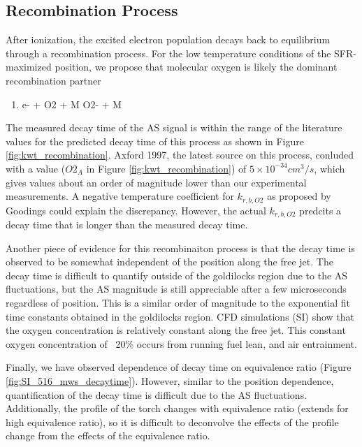 \subsection{Recombination Process}

After ionization, the excited electron population decays back to equilibrium through a recombination process. For the low temperature conditions of the SFR-maximized position, we propose that molecular oxygen is likely the dominant recombination partner

\begin{enumerate}
\item e- + O2 + M \rightarrow O2- + M 
\end{enumerate}

The measured decay time of the AS signal is within the range of the literature values for the predicted decay time of this process as shown in Figure \ref{fig:kwt_recombination}. Axford 1997, the latest source on this process, conluded with a value ($O2_A$ in Figure \ref{fig:kwt_recombination}) of $5 \times 10^{-34} cm^3/s$, which gives values about an order of magnitude lower than our experimental measurements. A negative temperature coefficient for $k_{r,b,O2}$ as proposed by Goodings could explain the discrepancy. However, the actual $k_{r,b,O2}$ predcits a decay time that is longer than the measured decay time. 

Another piece of evidence for this recombinaiton process is that the decay time is observed to be somewhat independent of the position along the free jet. The decay time is difficult to quantify outside of the goldilocks region due to the AS fluctuations, but the AS magnitude is still appreciable after a few microseconds regardless of position. This is a similar order of magnitude to the exponential fit time constants obtained in the goldilocks region. CFD simulations (SI) show that the oxygen concentration is relatively constant along the free jet. This constant oxygen concentration of ~20\% occurs from running fuel lean, and air entrainment.

Finally, we have observed dependence of decay time on equivalence ratio (Figure \ref*{fig:SI_516_mws_decaytime}). However, similar to the position dependence, quantification of the decay time is difficult due to the AS fluctuations. Additionally, the profile of the torch changes with equivalence ratio (extends for high equivalence ratio), so it is difficult to deconvolve the effects of the profile change from the effects of the equivalence ratio.



